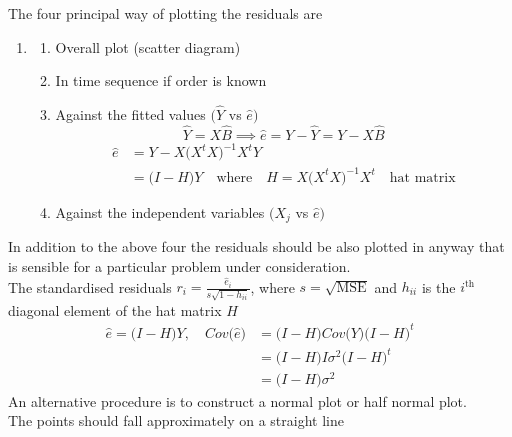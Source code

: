 \documentclass[11pt,a4paper]{article}
\theoremstyle{definition}
\begin{document}
The four principal way of plotting the residuals are
\begin{enumerate}
\item[]
\begin{enumerate}
       \item Overall plot (scatter diagram)
       \item In time sequence if order is known
       \item Against the fitted values $\big(\widehat{Y}$ vs $\widehat{e}\big)$
       $$\widehat{Y}=X\widehat{B}\implies \widehat{e}=Y-\widehat{Y}=Y-X\widehat{B}$$
\begin{align*}
\widehat{e} & = Y-X\big(X^tX\big)^{-1}X^tY\\
        & = \big(I-H\big)Y\quad  \text{where}\quad  H=X\big(X^tX\big)^{-1}X^t\quad  \text{hat matrix}
\end{align*}

       \item Against the independent variables $\big(X_j$ vs $\widehat{e}\big)$\\
\end{enumerate}
\end{enumerate}


In addition to the above four the residuals should be also plotted in anyway that is sensible for a particular problem under consideration.\\

The standardised residuals $r_i=\frac{\widehat{e}_i}{s\sqrt{1-h_{ii}}}$, where $s=\sqrt{\text{MSE}}$ and $h_{ii}$ is the $i^{\text{th}}$ diagonal element of the hat matrix $H$
\begin{align*}
\widehat{e}=\big(I-H\big)Y,\quad  Cov\big(\widehat{e}\big) & = \big(I-H\big)Cov\big(Y\big)\big(I-H\big)^t\\
                                                           & = \big(I-H\big)I\sigma^2\big(I-H\big)^t\\
                                                           & = \big(I-H\big)\sigma^2
\end{align*}
An alternative procedure is to construct a normal plot or half normal plot.\\

The points should fall approximately on a straight line

\begin{figure}[H]
\centering
{}\\
\end{figure}
 
\end{document}
